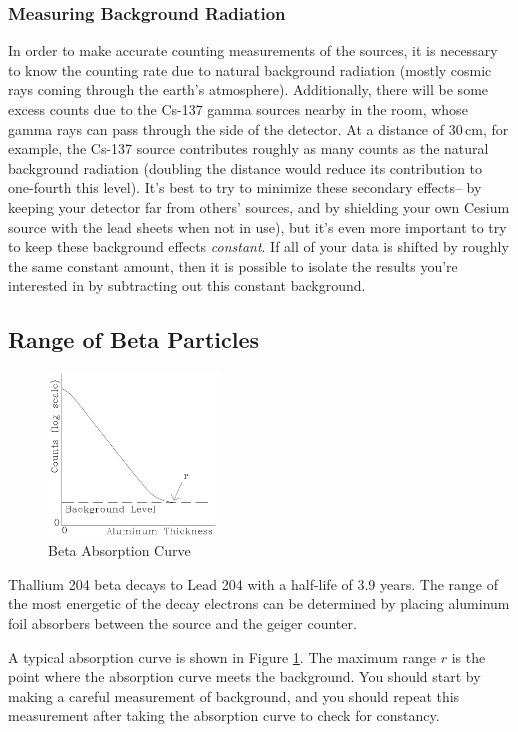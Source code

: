\subsubsection{Measuring Background Radiation}

In order to make accurate counting measurements of the sources, it is necessary to know the counting rate due to natural background radiation (mostly cosmic rays coming through the earth's atmosphere). Additionally, there will be some excess counts due to the Cs-137 gamma sources nearby in the room, whose gamma rays can pass through the side of the detector. At a distance of $30\,\mathrm{cm}$, for example, the Cs-137 source contributes roughly as many counts as the natural background radiation (doubling the distance would reduce its contribution to one-fourth this level). It's best to try to minimize these secondary effects-- by keeping your detector far from others' sources, and by shielding your own Cesium source with the lead sheets when not in use), but it's even more important to try to keep these background effects \emph{constant}. If all of your data is shifted by roughly the same constant amount, then it is possible to isolate the results you're interested in by subtracting out this constant background.

\subsection{Range of Beta Particles}
\begin{figure}[h]
\centering
\includegraphics[width=0.4\textwidth]{./Exp10/pic/image7.png}
\caption{Beta Absorption Curve}
\label{fig:beta}
\end{figure} 
Thallium 204 beta decays to Lead 204 with a half-life of 3.9 years. The range of the most energetic of the decay electrons can be determined by placing aluminum foil absorbers between the source and the geiger counter.\myskip

A typical absorption curve is shown in Figure {\ref{fig:beta}}. The maximum range $r$ is the point where the absorption curve meets the background. You should start by making a careful measurement of background, and you should repeat this measurement after taking the absorption curve to check for constancy.\myskip

